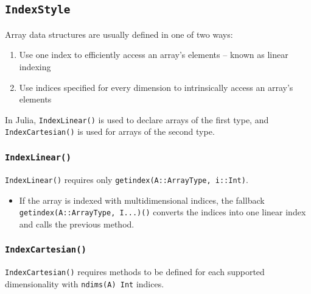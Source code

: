 \documentclass[10pt]{article}
\begin{document}
\subsection{\texttt{IndexStyle}}\label{index-style}
Array data structures are usually defined in one of two ways:
\begin{enumerate}
\def\labelenumi{\arabic{enumi}.}
\item
    Use one index to efficiently access an array's elements -- known as linear
    indexing
\item
    Use indices specified for every dimension to intrinsically access
    an array's elements
\end{enumerate}
In Julia, \texttt{IndexLinear()} is used to declare arrays of the first type,
and \texttt{IndexCartesian()} is used for arrays of the second type.

\subsubsection{\texttt{IndexLinear()}}\label{index-linear}
\texttt{IndexLinear()} requires only \texttt{getindex(A::ArrayType, i::Int)}.
\begin{itemize}
\item
    If the array is indexed with multidimensional indices, the fallback \\
    \texttt{getindex(A::ArrayType, I...)()} converts the indices
    into one linear index and calls the previous method.
\end{itemize}

\subsubsection{\texttt{IndexCartesian()}}\label{index-cartesian}
\texttt{IndexCartesian()} requires methods to be defined for each supported
dimensionality with \texttt{ndims(A) Int} indices.
\end{document}
